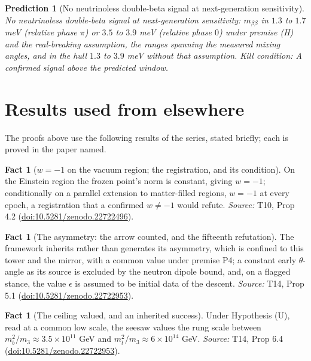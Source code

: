 \documentclass[11pt]{article}
\newtheorem{prediction}[theorem]{Prediction}
\theoremstyle{definition}
\newtheorem{fact}[theorem]{Fact}
\theoremstyle{plain}
\newcommand{\changedmark}[2]{\marginpar{\raggedright\scriptsize\color{#1}#2}}
\begin{document}
\begin{prediction}[No neutrinoless double-beta signal at next-generation sensitivity]\label{c:pred.no-neutrinoless-double-beta}
No neutrinoless double-beta signal at next-generation sensitivity: $m_{\beta\beta}$ in $1.3$ to $1.7$ meV (relative phase $\pi$) or $3.5$ to $3.9$ meV (relative phase $0$) under premise (H) and the real-breaking assumption, the ranges spanning the measured mixing angles, and in the hull $1.3$ to $3.9$ meV without that assumption.
\emph{Kill condition:} A confirmed signal above the predicted window.
\end{prediction}

\section{Results used from elsewhere}
The proofs above use the following results of the series, stated briefly; each is proved in the paper named.

\begin{fact}[$w = -1$ on the vacuum region; the registration, and its condition]\label{c:dark-energy.vacuum-region-registration-condition}
\changedmark{BrickRed}{corrected since the deposit}
On the Einstein region the frozen point's norm is constant, giving $w = -1$; conditionally on a parallel extension to matter-filled regions, $w = -1$ at every epoch, a registration that a confirmed $w\neq -1$ would refute.
\emph{Source:} T10, Prop 4.2 (\href{https://doi.org/10.5281/zenodo.22722496}{doi:10.5281/zenodo.22722496}).
\end{fact}

\begin{fact}[The asymmetry: the arrow counted, and the fifteenth refutation]\label{c:dark-matter.asymmetry-arrow-counted-fifteenth-refutation}
The framework inherits rather than generates its asymmetry, which is confined to this tower and the mirror, with a common value under premise P4; a constant early $\theta$-angle as its source is excluded by the neutron dipole bound, and, on a flagged stance, the value $\epsilon$ is assumed to be initial data of the descent.
\emph{Source:} T14, Prop 5.1 (\href{https://doi.org/10.5281/zenodo.22722953}{doi:10.5281/zenodo.22722953}).
\end{fact}

\begin{fact}[The ceiling valued, and an inherited success]\label{c:dark-matter.ceiling-valued-inherited-success}
Under Hypothesis (U), read at a common low scale, the seesaw values the rung scale between $m_{b}^{2}/m_{3} \approx 3.5 \times 10^{11}$ GeV and $m_{t}^{2}/m_{3} \approx 6 \times 10^{14}$ GeV.
\emph{Source:} T14, Prop 6.4 (\href{https://doi.org/10.5281/zenodo.22722953}{doi:10.5281/zenodo.22722953}).
\end{fact}
\end{document}
